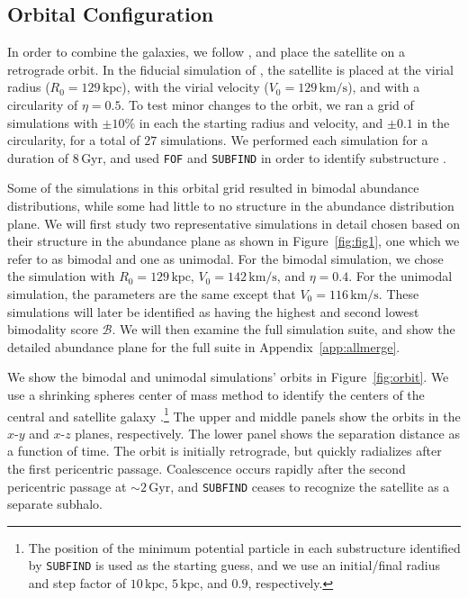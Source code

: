 \documentclass[twocolumn,linenumbers,trackchanges]{aastex631}
\newcommand{\Gyr}{\ensuremath{\textrm{Gyr}}}
\newcommand{\kpc}{\ensuremath{\textrm{kpc}}}
\newcommand{\kms}{\ensuremath{\textrm{km}/\textrm{s}}}
\begin{document}
\subsection{Orbital Configuration}\label{ssec:orbit_setup}
In order to combine the galaxies, we follow \citet{2021ApJ...923...92N}, and place the satellite on a retrograde orbit. In the fiducial simulation of \citet{2021ApJ...923...92N}, the satellite is placed at the virial radius ($R_0=129\,\kpc$), with the virial velocity ($V_0=129\,\kms$), and with a circularity of $\eta=0.5$. To test minor changes to the orbit, we ran a grid of simulations with $\pm10\%$ in each the starting radius and velocity, and $\pm0.1$ in the circularity, for a total of $27$ simulations. We performed each simulation for a duration of $8\,\Gyr$, and used \texttt{FOF} and \texttt{SUBFIND} in order to identify substructure \citep{2005Natur.435..629S,2009MNRAS.399..497D}.

Some of the simulations in this orbital grid resulted in bimodal abundance distributions, while some had little to no structure in the abundance distribution plane. We will first study two representative simulations in detail chosen based on their structure in the abundance plane as shown in Figure~\ref{fig:fig1}, one which we refer to as bimodal and one as unimodal. For the bimodal simulation, we chose the simulation with $R_0=129\,\kpc$, $V_0=142\,\kms$, and $\eta=0.4$. For the unimodal simulation, the parameters are the same except that $V_0=116\,\kms$. These simulations will later be identified as having the highest and second lowest bimodality score $\mathcal{B}$. We will then examine the full simulation suite, and show the detailed abundance plane for the full suite in Appendix~\ref{app:allmerge}.

We show the bimodal and unimodal simulations' orbits in Figure~\ref{fig:orbit}. We use a shrinking spheres center of mass method to identify the centers of the central and satellite galaxy \citep[e.g.,][]{2003MNRAS.338...14P}.\footnote{The position of the minimum potential particle in each substructure identified by \texttt{SUBFIND} is used as the starting guess, and we use an initial/final radius and step factor of $10\,\kpc$, $5\,\kpc$, and $0.9$, respectively.} The upper and middle panels show the orbits in the $x$-$y$ and $x$-$z$ planes, respectively. The lower panel shows the separation distance as a function of time. The orbit is initially retrograde, but quickly radializes after the first pericentric passage. Coalescence occurs rapidly after the second pericentric passage at $\sim2\,\Gyr$, and \texttt{SUBFIND} ceases to recognize the satellite as a separate subhalo.
\end{document}
